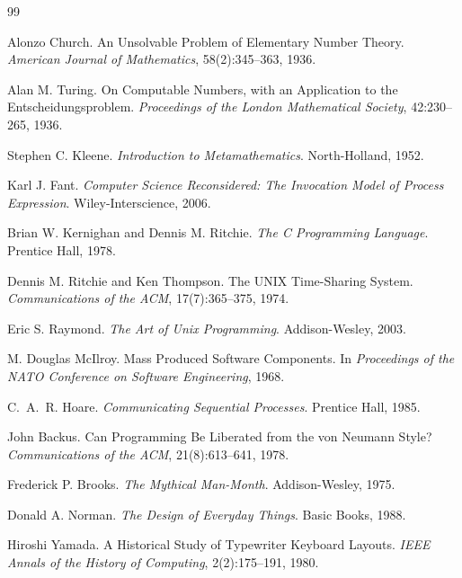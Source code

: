 \documentclass[12pt]{article}
\theoremstyle{definition}
\begin{document}
\newpage
\begin{thebibliography}{99}

Alonzo Church.
\newblock An Unsolvable Problem of Elementary Number Theory.
\newblock \emph{American Journal of Mathematics}, 58(2):345--363, 1936.

Alan M. Turing.
\newblock On Computable Numbers, with an Application to the Entscheidungsproblem.
\newblock \emph{Proceedings of the London Mathematical Society}, 42:230--265,
  1936.

Stephen C. Kleene.
\newblock \emph{Introduction to Metamathematics}.
\newblock North-Holland, 1952.

Karl J. Fant.
\newblock \emph{Computer Science Reconsidered: The Invocation Model of Process
  Expression}.
\newblock Wiley-Interscience, 2006.

Brian W. Kernighan and Dennis M. Ritchie.
\newblock \emph{The C Programming Language}.
\newblock Prentice Hall, 1978.

Dennis M. Ritchie and Ken Thompson.
\newblock The UNIX Time-Sharing System.
\newblock \emph{Communications of the ACM}, 17(7):365--375, 1974.

Eric S. Raymond.
\newblock \emph{The Art of Unix Programming}.
\newblock Addison-Wesley, 2003.

M. Douglas McIlroy.
\newblock Mass Produced Software Components.
\newblock In \emph{Proceedings of the NATO Conference on Software Engineering},
  1968.

C.\ A.\ R. Hoare.
\newblock \emph{Communicating Sequential Processes}.
\newblock Prentice Hall, 1985.

John Backus.
\newblock Can Programming Be Liberated from the von Neumann Style?
\newblock \emph{Communications of the ACM}, 21(8):613--641, 1978.

Frederick P. Brooks.
\newblock \emph{The Mythical Man-Month}.
\newblock Addison-Wesley, 1975.

Donald A. Norman.
\newblock \emph{The Design of Everyday Things}.
\newblock Basic Books, 1988.

Hiroshi Yamada.
\newblock A Historical Study of Typewriter Keyboard Layouts.
\newblock \emph{IEEE Annals of the History of Computing}, 2(2):175--191, 1980.


\end{thebibliography}
\end{document}
